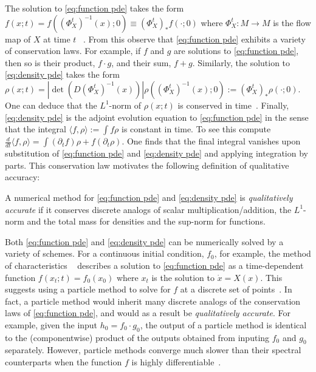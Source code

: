 \documentclass[final,leqno]{siamart}
\begin{document}
The solution to \eqref{eq:function pde} takes the form $f(x;t) = f( (\Phi_{X}^{t})^{-1}(x) ; 0) \equiv (\Phi_{X}^{t})_{*} f(\cdot;0)$
where $\Phi_{X}^{t}:M \to M$ is the flow map of $X$ at time $t$ ~\cite[Chapter 18]{Lee2006}.
From this observe that \eqref{eq:function pde} exhibits a variety of conservation laws.
For example, if $f$ and $g$ are solutions to \eqref{eq:function pde},
then so is their product, $f \cdot g$, and their sum, $f+g$.
Similarly, the solution to \eqref{eq:density pde} takes the form $\rho(x;t) = | \det( D(\Phi_{X}^{t})^{-1}(x) ) | \rho( (\Phi_{X}^{t})^{-1}(x) ;0) := (\Phi_{X}^{t})_{*} \rho(\cdot;0)$.
One can deduce that the $L^{1}$-norm of $\rho(x;t)$ is conserved in time~\cite[Theorem 16.42]{Lee2006}.
Finally, \eqref{eq:density pde} is the adjoint evolution equation to \eqref{eq:function pde} in the sense that the integral $\langle f , \rho \rangle := \int f \rho$ is constant in time. To see this compute
$\frac{d}{dt} \langle f , \rho \rangle = \int ( \partial_{t} f ) \rho + f ( \partial_{t} \rho) $.  One finds that the final integral vanishes upon substitution of \eqref{eq:function pde} and \eqref{eq:density pde} and applying integration by parts.
This conservation law motivates the following definition of qualitative accuracy:

\begin{definition} \label{def:quality}
	    A numerical method for \eqref{eq:function pde} and \eqref{eq:density pde} is \emph{qualitatively accurate} if it conserves discrete analogs of scalar multiplication/addition, the $L^{1}$-norm and the total mass for densities and the sup-norm for functions.
\end{definition}

Both \eqref{eq:function pde} and \eqref{eq:density pde} can be numerically solved by a variety of schemes.
For a continuous initial condition, $f_0$, for example, the method of characteristics ~\cite{Evans2010,MTA} describes a solution to \eqref{eq:function pde} as a time-dependent function $f( x_{t} ;t) = f_{0}( x_{0} )$ where $x_{t}$ is the solution to $\dot{x} = X(x)$.
This suggests using a particle method to solve for $f$ at a discrete set of points~\cite{Leveque1992}.
 In fact, a particle method would inherit many discrete analogs of the conservation laws of \eqref{eq:function pde}, and would as a result be \emph{qualitatively accurate}.
For example, given the input $h_{0} = f_{0} \cdot g_{0}$, the output of a particle method is identical to the (componentwise) product of the outputs obtained from inputing $f_{0}$ and $g_{0}$ separately.
However, particle methods converge much slower than their spectral counterparts when the function $f$ is highly differentiable~\cite{Boyd2001,Gottlieb2001}.
\end{document}
